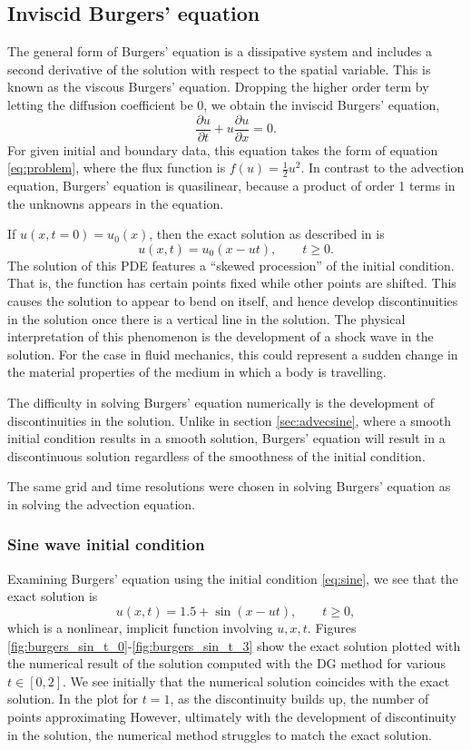 \subsection{Inviscid Burgers' equation}

The general form of Burgers' equation is a dissipative system and includes a second derivative of the solution with respect to the spatial variable.
This is known as the viscous Burgers' equation.
Dropping the higher order term by letting the diffusion coefficient be 0, we obtain the inviscid Burgers' equation,
\[
	\frac{\partial u}{\partial t} + u\frac{\partial u}{\partial x} = 0.
\]
For given initial and boundary data, this equation takes the form of equation \eqref{eq:problem}, where the flux function is $f(u)= \frac{1}{2}u^2$. 
In contrast to the advection equation, Burgers' equation is quasilinear, because a product of order 1 terms in the unknowns appears in the equation.

If $u(x,t=0)=u_0(x)$, then the exact solution as described in \cite{salih2015inviscid} is
\[
	u(x,t) = u_0(x-u t), \qquad t \geq 0. \label{eq:burgerssol}
\]
The solution of this PDE features a ``skewed procession'' of the initial condition.
That is, the function has certain points fixed while other points are shifted.
This causes the solution to appear to bend on itself, and hence develop discontinuities in the solution once there is a vertical line in the solution.
The physical interpretation of this phenomenon is the development of a shock wave in the solution.
For the case in fluid mechanics, this could represent a sudden change in the material properties of the medium in which a body is travelling.

The difficulty in solving Burgers' equation numerically is the development of discontinuities in the solution.
Unlike in section \ref{sec:advecsine}, where a smooth initial condition results in a smooth solution, Burgers' equation will result in a discontinuous solution regardless of the smoothness of the initial condition.

The same grid and time resolutions were chosen in solving Burgers' equation as in solving the advection equation.


\subsubsection{Sine wave initial condition}

Examining Burgers' equation using the initial condition \eqref{eq:sine}, we see that the exact solution is
\[
	u(x,t) = 1.5 + \sin(x-ut), \qquad t\geq 0,
\]
which is a nonlinear, implicit function involving $u,x,t$.
Figures \ref{fig:burgers_sin_t_0}-\ref{fig:burgers_sin_t_3} show the exact solution plotted with the numerical result of the solution computed with the DG method for various $t\in \left[0,2\right]$.
We see initially that the numerical solution coincides with the exact solution.
In the plot for $t=1$, as the discontinuity builds up, the number of points approximating 
However, ultimately with the development of discontinuity in the solution, the numerical method struggles to match the exact solution.

